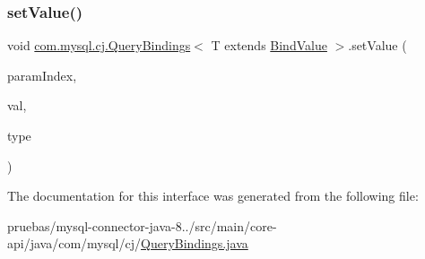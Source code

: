 \subsubsection{\texorpdfstring{set\+Value()}{setValue()}\hspace{0.1cm}{\footnotesize\ttfamily [4/4]}}
{\footnotesize\ttfamily void \mbox{\hyperlink{interfacecom_1_1mysql_1_1cj_1_1_query_bindings}{com.\+mysql.\+cj.\+Query\+Bindings}}$<$ T extends \mbox{\hyperlink{interfacecom_1_1mysql_1_1cj_1_1_bind_value}{Bind\+Value}} $>$.set\+Value (\begin{DoxyParamCaption}\item[{int}]{param\+Index,  }\item[{String}]{val,  }\item[{\mbox{\hyperlink{enumcom_1_1mysql_1_1cj_1_1_mysql_type}{Mysql\+Type}}}]{type }\end{DoxyParamCaption})}



The documentation for this interface was generated from the following file\+:\begin{DoxyCompactItemize}
\item 
pruebas/mysql-\/connector-\/java-\/8../src/main/core-\/api/java/com/mysql/cj/\mbox{\hyperlink{_query_bindings_8java}{Query\+Bindings.\+java}}\end{DoxyCompactItemize}
